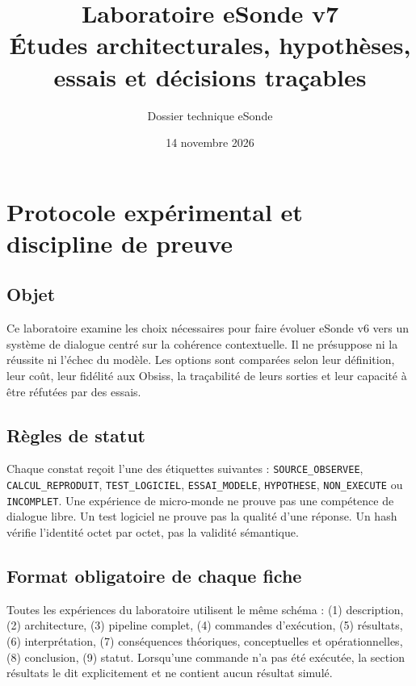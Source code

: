 \documentclass[11pt,a4paper]{report}
\title{\textbf{Laboratoire eSonde v7}\\[0.5em]\large Études architecturales, hypothèses, essais et décisions traçables}
\author{Dossier technique eSonde}
\date{14 novembre 2026}
\begin{document}
\maketitle
\tableofcontents
\clearpage
{}

\chapter{Protocole expérimental et discipline de preuve}
\section{Objet}
Ce laboratoire examine les choix nécessaires pour faire évoluer eSonde v6 vers un système de dialogue centré sur la cohérence contextuelle. Il ne présuppose ni la réussite ni l'échec du modèle. Les options sont comparées selon leur définition, leur coût, leur fidélité aux Obsiss, la traçabilité de leurs sorties et leur capacité à être réfutées par des essais.

\section{Règles de statut}
Chaque constat reçoit l'une des étiquettes suivantes : \texttt{SOURCE\_OBSERVEE}, \texttt{CALCUL\_REPRODUIT}, \texttt{TEST\_LOGICIEL}, \texttt{ESSAI\_MODELE}, \texttt{HYPOTHESE}, \texttt{NON\_EXECUTE} ou \texttt{INCOMPLET}. Une expérience de micro-monde ne prouve pas une compétence de dialogue libre. Un test logiciel ne prouve pas la qualité d'une réponse. Un hash vérifie l'identité octet par octet, pas la validité sémantique.

\section{Format obligatoire de chaque fiche}
Toutes les expériences du laboratoire utilisent le même schéma : (1) description, (2) architecture, (3) pipeline complet, (4) commandes d'exécution, (5) résultats, (6) interprétation, (7) conséquences théoriques, conceptuelles et opérationnelles, (8) conclusion, (9) statut. Lorsqu'une commande n'a pas été exécutée, la section résultats le dit explicitement et ne contient aucun résultat simulé.
\end{document}
